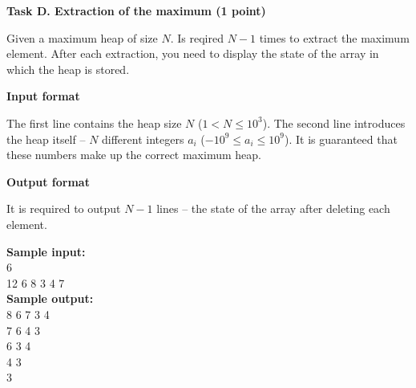 \documentclass[a4paper]{article}
\begin{document}
\textbf{Task D. Extraction of the maximum (1 point)}

\SPACE

Given a maximum heap of size $N$. Is reqired $N-1$ times to extract the maximum element. After each extraction, you need to display the state of the array in which the heap is stored.

\SPACE

\textbf{Input format}

The first line contains the heap size $N$ ($1 < N \le 10^3$). The second line introduces the heap itself -- $N$ different integers $a_i$ ($-10^9 \le a_i \le 10^9$). It is guaranteed that these numbers make up the correct maximum heap.

\SPACE

\textbf{Output format}

It is required to output $N-1$ lines -- the state of the array after deleting each element.

\SPACE

\noindent \textbf{Sample input:}\\
6\\
12 6 8 3 4 7\\


\noindent \textbf{Sample output:}\\
8 6 7 3 4\\
7 6 4 3\\
6 3 4\\
4 3\\
3\\
\end{document}
